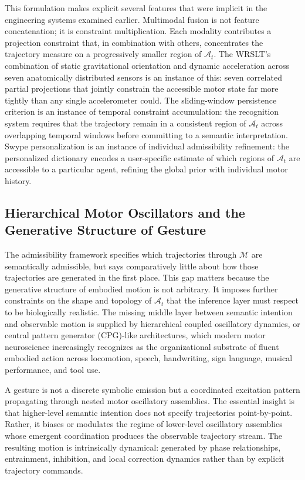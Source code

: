 \documentclass[11pt, a4paper]{article}
\theoremstyle{definition}
\begin{document}
This formulation makes explicit several features that were implicit in the engineering systems examined earlier. Multimodal fusion is not feature concatenation; it is constraint multiplication. Each modality contributes a projection constraint that, in combination with others, concentrates the trajectory measure on a progressively smaller region of $\mathcal{A}_t$. The WRSLT's combination of static gravitational orientation and dynamic acceleration across seven anatomically distributed sensors is an instance of this: seven correlated partial projections that jointly constrain the accessible motor state far more tightly than any single accelerometer could. The sliding-window persistence criterion is an instance of temporal constraint accumulation: the recognition system requires that the trajectory remain in a consistent region of $\mathcal{A}_t$ across overlapping temporal windows before committing to a semantic interpretation. Swype personalization is an instance of individual admissibility refinement: the personalized dictionary encodes a user-specific estimate of which regions of $\mathcal{A}_t$ are accessible to a particular agent, refining the global prior with individual motor history.

\subsection{Hierarchical Motor Oscillators and the Generative Structure of Gesture}

The admissibility framework specifies which trajectories through $\mathcal{M}$ are semantically admissible, but says comparatively little about how those trajectories are generated in the first place. This gap matters because the generative structure of embodied motion is not arbitrary. It imposes further constraints on the shape and topology of $\mathcal{A}_t$ that the inference layer must respect to be biologically realistic. The missing middle layer between semantic intention and observable motion is supplied by hierarchical coupled oscillatory dynamics, or central pattern generator (CPG)-like architectures, which modern motor neuroscience increasingly recognizes as the organizational substrate of fluent embodied action across locomotion, speech, handwriting, sign language, musical performance, and tool use.

A gesture is not a discrete symbolic emission but a coordinated excitation pattern propagating through nested motor oscillatory assemblies. The essential insight is that higher-level semantic intention does not specify trajectories point-by-point. Rather, it biases or modulates the regime of lower-level oscillatory assemblies whose emergent coordination produces the observable trajectory stream. The resulting motion is intrinsically dynamical: generated by phase relationships, entrainment, inhibition, and local correction dynamics rather than by explicit trajectory commands.
\end{document}

